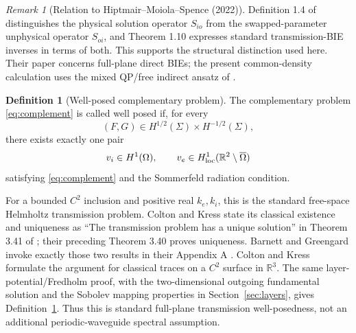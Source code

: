 \documentclass[11pt]{article}
\newcommand{\Om}{\Omega}
\newcommand{\Sig}{\Sigma}
\newcommand{\R}{\mathbb R}
\theoremstyle{plain}
\theoremstyle{definition}
\newtheorem{definition}[theorem]{Definition}
\theoremstyle{remark}
\newtheorem{remark}[theorem]{Remark}
\begin{document}
\begin{remark}[Relation to Hiptmair--Moiola--Spence (2022)]
Definition 1.4 of \cite{HiptmairMoiolaSpence2022} distinguishes the physical
solution operator \(S_{io}\) from the swapped-parameter unphysical operator
\(S_{oi}\), and Theorem 1.10 expresses standard transmission-BIE inverses in
terms of both.  This supports the structural distinction used here.  Their
paper concerns full-plane direct BIEs; the present common-density calculation
uses the mixed QP/free indirect ansatz of \cite[Appendix A]{BarnettGreengard2010}.
\end{remark}

\begin{definition}[Well-posed complementary problem]
\label{def:complement-solvability}
The complementary problem \eqref{eq:complement} is called well posed if, for
every
\[
(F,G)\in H^{1/2}(\Sig)\times H^{-1/2}(\Sig),
\]
there exists exactly one pair
\[
v_i\in H^1(\Om),\qquad
v_e\in H^1_{\rm loc}(\R^2\setminus\overline\Om)
\]
satisfying \eqref{eq:complement} and the Sommerfeld radiation condition.
\end{definition}

For a bounded \(C^2\) inclusion and positive real \(k_e,k_i\), this is the
standard free-space Helmholtz transmission problem.  Colton and Kress state
its classical existence and uniqueness as ``The transmission problem has a
unique solution'' in Theorem 3.41 of \cite[Theorem 3.41,
p.~101]{ColtonKress1983}; their preceding Theorem 3.40 proves uniqueness.
Barnett and Greengard invoke exactly those two results in their Appendix A
\cite[pp.~22--24]{BarnettGreengard2010}.  Colton and Kress formulate the
argument for classical traces on a \(C^2\) surface in \(\R^3\).  The same
layer-potential/Fredholm proof, with the two-dimensional outgoing fundamental
solution and the Sobolev mapping properties in Section~\ref{sec:layers}, gives
Definition~\ref{def:complement-solvability}.  Thus this is standard
full-plane transmission well-posedness, not an additional periodic-waveguide
spectral assumption.
\end{document}
